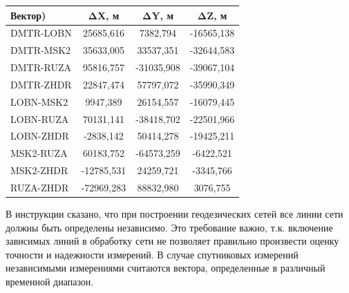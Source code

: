\begin{table} [htbp]
	\centering\small
	\begin{threeparttable}%
		\label{tab:tab25}
		\setlength{\tabcolsep}{20pt}
		
			\begin{tabular}{ l
				             S[table-number-alignment = center]
				             S[table-number-alignment = center]
				             S[table-number-alignment = center] }
			
				
				\toprule
				\textbf{Вектор)}			& \textbf{ΔX, м}	& \textbf{ΔY, м}	& \textbf{ΔZ, м}	\\ \midrule
				DMTR-LOBN					&  25685,616		&   7382,794		& -16565,138		\\ %
				DMTR-MSK2					&  35633,005		&  33537,351		& -32644,583		\\ %
				DMTR-RUZA					&  95816,757		& -31035,908		& -39067,104		\\ %
				DMTR-ZHDR					&  22847,474		&  57797,072		& -35990,349		\\ %
				LOBN-MSK2					&   9947,389		&  26154,557		& -16079,445		\\ %
				LOBN-RUZA					&  70131,141		& -38418,702		& -22501,966		\\ %
				LOBN-ZHDR					&  -2838,142		&  50414,278		& -19425,211		\\ %
				MSK2-RUZA					&  60183,752		& -64573,259		&  -6422,521		\\ %
				MSK2-ZHDR					& -12785,531		&  24259,721		&  -3345,766		\\ %
				RUZA-ZHDR					& -72969,283		&  88832,980		&   3076,755		\\ \bottomrule
			\end{tabular}
		
	\end{threeparttable}
\end{table}

В инструкции \cite{src10,src19} сказано, что при построении геодезических сетей все линии сети должны быть определены независимо. Это требование важно, т.к. включение зависимых линий в обработку сети не позволяет правильно произвести оценку точности и надежности измерений. В случае спутниковых измерений независимыми измерениями считаются вектора, определенные в различный временной диапазон.


